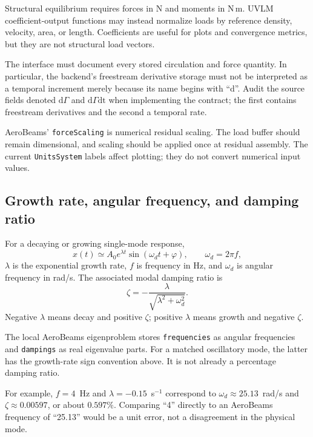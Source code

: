 \documentclass[11pt,a4paper]{article}
\newcommand{\code}{\nolinkurl}
\begin{document}
Structural equilibrium requires forces in N and moments in N\,m. UVLM
coefficient-output functions may instead normalize loads by reference density,
velocity, area, or length. Coefficients are useful for plots and convergence
metrics, but they are not structural load vectors.

The interface must document every stored circulation and force quantity.
In particular, the backend's freestream derivative storage must not be
interpreted as a temporal increment merely because its name begins with ``d''.
Audit the source fields denoted $\mathrm{d}\Gamma$ and
$\mathrm{d}\Gamma\mathrm{dt}$ when implementing the contract; the first
contains freestream derivatives and the second a temporal rate.

AeroBeams' \code{forceScaling} is numerical residual scaling. The load buffer
should remain dimensional, and scaling should be applied once at residual
assembly. The current \code{UnitsSystem} labels affect plotting; they do not
convert numerical input values.

\subsection{Growth rate, angular frequency, and damping ratio}
\label{sec:dampingmeaning}

For a decaying or growing single-mode response,
\begin{equation}
 x(t)\simeq A_0 e^{\lambda t}\sin(\omega_d t+\varphi),
 \qquad \omega_d=2\pi f,
\end{equation}
$\lambda$ is the exponential growth rate, $f$ is frequency in Hz, and
$\omega_d$ is angular frequency in rad/s. The associated modal damping ratio is
\begin{equation}
 \zeta=-\frac{\lambda}{\sqrt{\lambda^2+\omega_d^2}}.
\end{equation}
Negative $\lambda$ means decay and positive $\zeta$; positive $\lambda$
means growth and negative $\zeta$.

The local AeroBeams eigenproblem stores \code{frequencies} as angular
frequencies and \code{dampings} as real eigenvalue parts. For a matched
oscillatory mode, the latter has the growth-rate sign convention above. It
is not already a percentage damping ratio.

For example, $f=4$~Hz and $\lambda=-0.15$~s$^{-1}$ correspond to
$\omega_d\approx25.13$~rad/s and $\zeta\approx0.00597$, or about
$0.597\%$. Comparing ``4'' directly to an AeroBeams frequency of ``25.13''
would be a unit error, not a disagreement in the physical mode.
\end{document}
